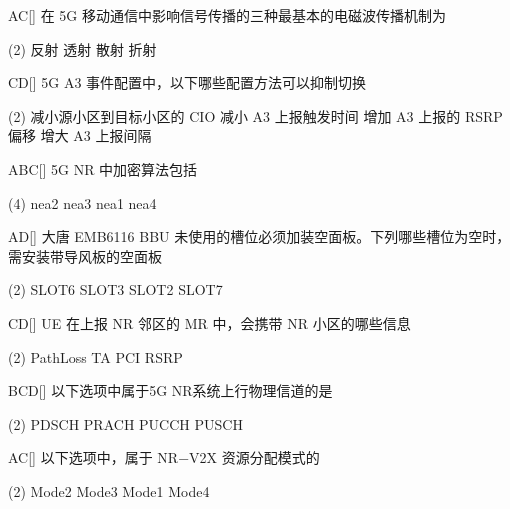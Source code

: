 \begin{choice}{\;AC\;}[]
    在 5G 移动通信中影响信号传播的三种最基本的电磁波传播机制为
    \begin{tasks}(2)
        \task 反射
        \task 透射
        \task 散射
        \task 折射
    \end{tasks}
\end{choice}


\begin{choice}{\;CD\;}[]
    5G A3 事件配置中，以下哪些配置方法可以抑制切换
    \begin{tasks}(2)
        \task 减小源小区到目标小区的 CIO
        \task 减小 A3 上报触发时间
        \task 增加 A3 上报的 RSRP 偏移
        \task 增大 A3 上报间隔
    \end{tasks}
\end{choice}


\begin{choice}{\;ABC\;}[]
    5G NR 中加密算法包括
    \begin{tasks}(4)
        \task nea2
        \task nea3
        \task nea1
        \task nea4
    \end{tasks}
\end{choice}


\begin{choice}{\;AD\;}[]
    大唐 EMB6116 BBU 未使用的槽位必须加装空面板。下列哪些槽位为空时，需安装带导风板的空面板
    \begin{tasks}(2)
        \task SLOT6
        \task SLOT3
        \task SLOT2
        \task SLOT7
    \end{tasks}
\end{choice}


\begin{choice}{\;CD\;}[]
    UE 在上报 NR 邻区的 MR 中，会携带 NR 小区的哪些信息
    \begin{tasks}(2)
        \task  PathLoss
        \task TA
        \task PCI
        \task RSRP
    \end{tasks}
\end{choice}


\begin{choice}{\;BCD\;}[]
    以下选项中属于5G NR系统上行物理信道的是
    \begin{tasks}(2)
        \task  PDSCH
        \task PRACH
        \task PUCCH
        \task PUSCH
    \end{tasks}
\end{choice}

\begin{choice}{\;AC\;}[]
    以下选项中，属于 NR−V2X 资源分配模式的
    \begin{tasks}(2)
        \task Mode2
        \task Mode3
        \task Mode1
        \task Mode4
    \end{tasks}
\end{choice}

